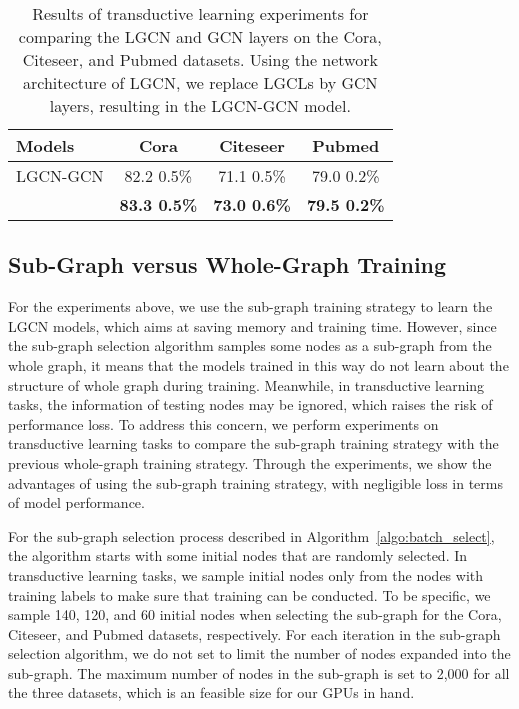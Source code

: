 \documentclass[sigconf]{acmart}
\begin{document}
\begin{table}[t]
\centering \caption{Results of transductive learning experiments for
comparing the LGCN and GCN layers on the Cora, Citeseer, and
Pubmed datasets. Using the network architecture of LGCN, we
replace LGCLs by GCN layers, resulting in the LGCN-GCN
model.} \label{table:lgcl_vs_gcn}
\begin{tabular}{  l   c  c  c}
    \hline
    \textbf{Models} & \textbf{Cora} & \textbf{Citeseer} & \textbf{Pubmed} \\ \hline\hline
    LGCN-GCN   & 82.2  0.5\%   & 71.1  0.5\% & 79.0  0.2\% \\ \hline
   \textbf{} & \textbf{83.3  0.5\%}
                                                  & \textbf{73.0  0.6\%}
                                                  & \textbf{79.5  0.2\%} \\
    \hline
\end{tabular}
\end{table}


\subsection{Sub-Graph versus Whole-Graph Training}


For the experiments above, we use the sub-graph training strategy to
learn the LGCN models, which aims at saving memory and training
time. However, since the sub-graph selection algorithm samples some
nodes as a sub-graph from the whole graph, it means that the models
trained in this way do not learn about the structure of whole graph
during training. Meanwhile, in transductive learning tasks, the
information of testing nodes may be ignored, which raises the risk
of performance loss. To address this concern, we perform experiments
on transductive learning tasks to compare the sub-graph training
strategy with the previous whole-graph training strategy. Through
the experiments, we show the advantages of using the sub-graph
training strategy, with negligible loss in terms of model
performance.


For the sub-graph selection process described in
Algorithm~\ref{algo:batch_select}, the algorithm starts with some
initial nodes that are randomly selected. In transductive learning
tasks, we sample initial nodes only from the nodes with training
labels to make sure that training can be conducted. To be specific,
we sample 140, 120, and 60 initial nodes when selecting the
sub-graph for the Cora, Citeseer, and Pubmed datasets, respectively.
For each iteration in the sub-graph selection algorithm, we do not
set  to limit the number of nodes expanded into the sub-graph.
The maximum number of nodes in the sub-graph is set to 2,000 for all
the three datasets, which is an feasible size for our GPUs in hand.
\end{document}
